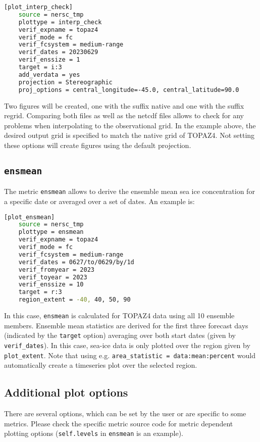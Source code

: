 \documentclass[DIV=10, parskip=full]{scrreprt}
\begin{document}
\begin{lstlisting}[language=bash]
	[plot_interp_check]
	source = nersc_tmp
	plottype = interp_check
	verif_expname = topaz4
	verif_mode = fc
	verif_fcsystem = medium-range
	verif_dates = 20230629
	verif_enssize = 1
	target = i:3
	add_verdata = yes
	projection = Stereographic
	proj_options = central_longitude=-45.0, central_latitude=90.0
\end{lstlisting}

Two figures will be created, one with the suffix native and one with the suffix regrid. Comparing both files as well as the netcdf files allows to check for any problems when interpolating to the observational grid. In the example above, the desired output grid is specified to match the native grid of TOPAZ4. Not setting these options will create figures using the default projection.   

\subsection{\texttt{ensmean}}
The metric \texttt{ensmean} allows to derive the ensemble mean sea ice concentration for a specific date or averaged over a set of dates. An example is:

\begin{lstlisting}[language=bash]
	[plot_ensmean]
	source = nersc_tmp
	plottype = ensmean
	verif_expname = topaz4
	verif_mode = fc
	verif_fcsystem = medium-range
	verif_dates = 0627/to/0629/by/1d
	verif_fromyear = 2023
	verif_toyear = 2023
	verif_enssize = 10
	target = r:3
	region_extent = -40, 40, 50, 90
\end{lstlisting}

In this case, \texttt{ensmean} is calculated for TOPAZ4 data using all 10 ensemble members. Ensemble mean statistics are derived for the first three forecast days (indicated by the \texttt{target} option) averaging over both start dates (given by \texttt{verif\_dates}). In this case, sea-ice data is only plotted over the region given by \texttt{plot\_extent}. Note that using e.g. \texttt{area\_statistic = data:mean:percent} would automatically create a timeseries plot over the selected region.


\subsection{Additional plot options}\label{subsec:add_options}
There are several options, which can be set by the user or are specific to some metrics. Please check the specific metric source code for metric dependent plotting options (\texttt{self.levels} in \texttt{ensmean} is an example).\\
\end{document}
